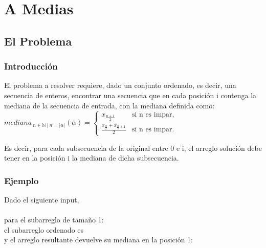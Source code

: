 \documentclass[spanish,a4paper]{article}
\begin{document}
\newcommand*{\boxednumber}[1]{%
    \expandafter\readdigit\the\numexpr#1\relax\relax
}
\newcommand*{\readdigit}[1]{%
    \ifx\relax#1\else
        \boxeddigit{#1}%
        \expandafter\readdigit
    \fi
}
\newcommand*{\boxeddigit}[1]{\fbox{#1}\hspace{-\fboxrule}}



\section{A Medias}


\subsection{El Problema}
\subsubsection{Introducción}
El problema a resolver requiere, dado un conjunto ordenado, es decir, una secuencia de enteros, encontrar una secuencia que en cada posición i contenga la mediana de la secuencia de entrada, con la mediana definida como:\\


$
mediana_{\ n \in \mathbb{N}\ |\ n = |\alpha|}(\alpha)=\begin{cases}
x_{\frac{n+1}{2}}& \text{si n es impar},\\
\frac{x_{\frac{n}{2}} + x_{\frac{n}{2} + 1}}{2}& \text{si n es impar}.
\end{cases}
$\\

\hfill

Es decir, para cada subsecuencia de la original entre 0 e i, el arreglo solución debe tener en la posición i la mediana de dicha subsecuencia.

\subsubsection{Ejemplo}

Dado el siguiente input,\\

\boxednumber{839154}\\


para el subarreglo de tamaño 1:\boxednumber{8}\\
el subarreglo ordenado es \boxednumber{8}\\
y el arreglo resultante devuelve su mediana en la posición 1:\boxednumber{8}\\
\end{document}
